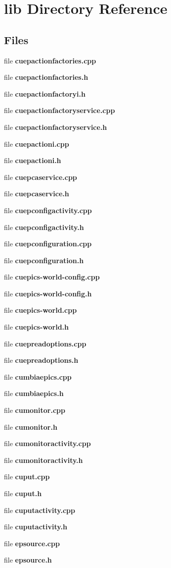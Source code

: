 \section{lib Directory Reference}
\label{dir_97aefd0d527b934f1d99a682da8fe6a9}
\subsection*{Files}
\begin{DoxyCompactItemize}
\item 
file \textbf{ cuepactionfactories.\+cpp}
\item 
file \textbf{ cuepactionfactories.\+h}
\item 
file \textbf{ cuepactionfactoryi.\+h}
\item 
file \textbf{ cuepactionfactoryservice.\+cpp}
\item 
file \textbf{ cuepactionfactoryservice.\+h}
\item 
file \textbf{ cuepactioni.\+cpp}
\item 
file \textbf{ cuepactioni.\+h}
\item 
file \textbf{ cuepcaservice.\+cpp}
\item 
file \textbf{ cuepcaservice.\+h}
\item 
file \textbf{ cuepconfigactivity.\+cpp}
\item 
file \textbf{ cuepconfigactivity.\+h}
\item 
file \textbf{ cuepconfiguration.\+cpp}
\item 
file \textbf{ cuepconfiguration.\+h}
\item 
file \textbf{ cuepics-\/world-\/config.\+cpp}
\item 
file \textbf{ cuepics-\/world-\/config.\+h}
\item 
file \textbf{ cuepics-\/world.\+cpp}
\item 
file \textbf{ cuepics-\/world.\+h}
\item 
file \textbf{ cuepreadoptions.\+cpp}
\item 
file \textbf{ cuepreadoptions.\+h}
\item 
file \textbf{ cumbiaepics.\+cpp}
\item 
file \textbf{ cumbiaepics.\+h}
\item 
file \textbf{ cumonitor.\+cpp}
\item 
file \textbf{ cumonitor.\+h}
\item 
file \textbf{ cumonitoractivity.\+cpp}
\item 
file \textbf{ cumonitoractivity.\+h}
\item 
file \textbf{ cuput.\+cpp}
\item 
file \textbf{ cuput.\+h}
\item 
file \textbf{ cuputactivity.\+cpp}
\item 
file \textbf{ cuputactivity.\+h}
\item 
file \textbf{ epsource.\+cpp}
\item 
file \textbf{ epsource.\+h}
\end{DoxyCompactItemize}
